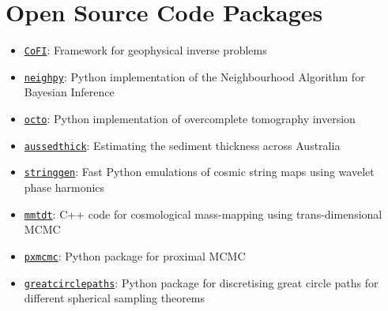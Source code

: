 \nocite{marignier2025}
\nocite{hicks2025}
\nocite{marignier2024-1}
\nocite{he2024}
\nocite{tsekmistremko2024}
\nocite{marignier2024}
\nocite{sturgeon2023}
\nocite{marignier2023-2}
\nocite{price2023}
\nocite{marignier2023-1}
\nocite{marignier2023}
\nocite{PhD}
\nocite{cobb2021}
\nocite{marignier2020}
\nocite{ferreira2020}



\section{Open Source Code Packages}

\begin{itemize}[label={}, nosep]
    \item \texttt{\href{https://github.com/inlab-geo/cofi}{CoFI}}: Framework for geophysical inverse problems
    \item \texttt{\href{https://github.com/auggiemarignier/neighpy}{neighpy}}: Python implementation of the Neighbourhood Algorithm for Bayesian Inference
    \item \texttt{\href{https://github.com/auggiemarignier/octo}{octo}}: Python implementation of overcomplete tomography inversion
    \item \texttt{\href{https://github.com/auggiemarignier/AusSedThick}{aussedthick}}: Estimating the sediment thickness across Australia
    \item \texttt{\href{https://github.com/astro-informatics/stringgen}{stringgen}}: Fast Python emulations of cosmic string maps using wavelet phase harmonics
    \item \texttt{\href{https://github.com/auggiemarignier/tdtmassmapping}{mmtdt}}: C++ code for cosmological mass-mapping using trans-dimensional MCMC
    \item \texttt{\href{https://github.com/auggiemarignier/pxmcmc}{pxmcmc}}: Python package for proximal MCMC
    \item \texttt{\href{https://github.com/auggiemarignier/GreatCirclePaths}{greatcirclepaths}}: Python package for discretising great circle paths for different spherical sampling theorems
\end{itemize}




